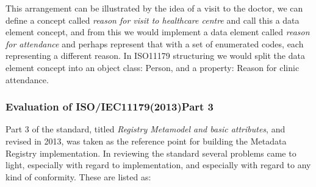 \documentclass[runningheads]{llncs}
\begin{document}
	This arrangement can be illustrated by the idea of a visit to the doctor, we can define a concept called \emph{reason for visit to healthcare centre} and call this a data element concept, and from this we would implement a data element called \emph{reason for attendance} and perhaps represent that with a set of enumerated codes, each representing a different reason. In ISO11179 structuring we would split the data element concept into an object class: Person, and a property: Reason for clinic attendance. 
	
	
	
	
	\subsubsection{Evaluation of ISO/IEC11179(2013)Part 3}
	Part 3 of the standard, titled \emph{Registry Metamodel and basic attributes}, and revised in 2013, was taken as the reference point for building the Metadata Registry implementation. In reviewing the standard several problems came to light, especially with regard to implementation, and especially with regard to any kind of conformity. These are listed as:
\end{document}
